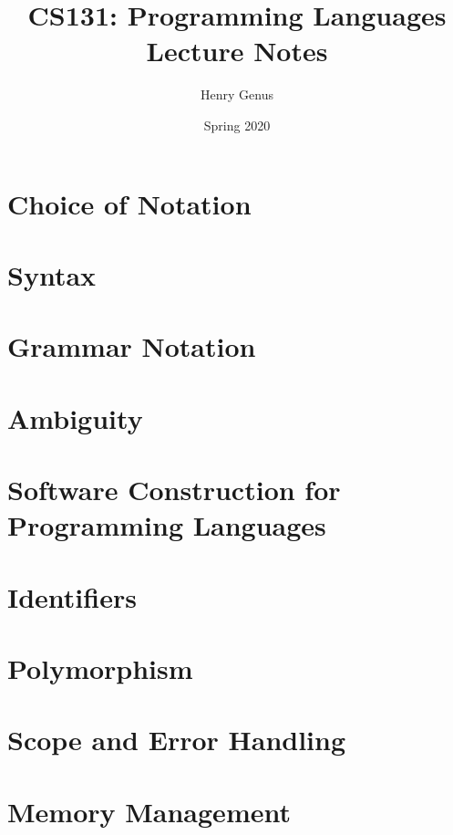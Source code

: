 \documentclass[9pt]{extarticle}
\title{CS131: Programming Languages\\Lecture Notes}
\author{Henry Genus}
\date{Spring 2020}
\begin{document}
\maketitle
\tableofcontents

\newpage
\section{Choice of Notation}


\newpage
\section{Syntax}


\newpage
\section{Grammar Notation}


\newpage
\section{Ambiguity}


\newpage
\section{Software Construction for Programming Languages}


\newpage
\section{Identifiers}


\newpage
\section{Polymorphism}


\newpage
\section{Scope and Error Handling}


\newpage
\section{Memory Management}

\end{document}
